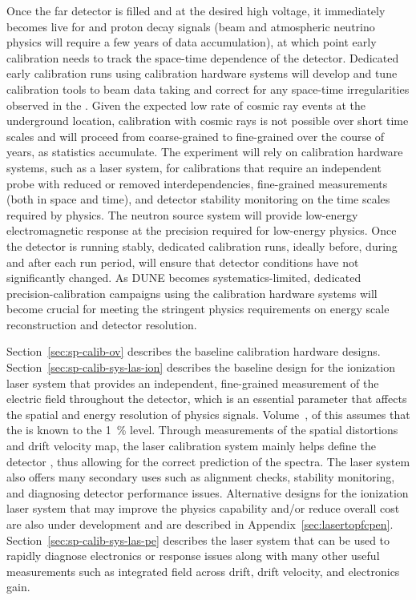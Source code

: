 Once the far detector is filled and at the desired high voltage, it immediately becomes live for  and proton decay signals (beam and atmospheric neutrino physics will require a few years of data accumulation), at which point %
early calibration needs to track %
the space-time dependence of the detector. Dedicated early calibration runs using calibration hardware systems will develop and tune calibration tools to beam data taking and correct for any space-time irregularities observed in the . Given the expected low rate of cosmic ray events at the underground location, calibration with cosmic rays is not possible over short time scales and will proceed from coarse-grained to fine-grained over the course of years, as statistics accumulate. 
The experiment will rely on calibration hardware systems, such as a laser system, for calibrations that require an independent probe with reduced or removed interdependencies, fine-grained measurements (both in space and time), and detector stability monitoring on the time scales required by physics. The neutron source system will provide low-energy electromagnetic response at the precision required for low-energy  physics. 
Once the detector is running stably, dedicated calibration runs, ideally before, during and after each run period, will ensure that detector conditions have not significantly changed. As DUNE becomes systematics-limited, dedicated precision-calibration campaigns using the calibration hardware systems will become crucial for meeting the stringent physics requirements on energy scale reconstruction and detector resolution.

Section~\ref{sec:sp-calib-ov} describes the baseline calibration hardware designs. Section~\ref{sec:sp-calib-sys-las-ion} describes the baseline design for the ionization laser system that provides an independent, fine-grained measurement of the electric field throughout the detector, which is an essential parameter that affects the spatial and energy resolution of physics signals. 
Volume~\volnumberphysics, \voltitlephysics of this 
assumes that the  is known to the \SI{1}{\%} level. Through measurements of the spatial distortions and drift velocity map, the laser calibration system mainly helps define the detector , thus allowing for the correct prediction of the  spectra. The laser system also offers many secondary uses such as alignment checks, stability monitoring, and diagnosing detector performance issues. Alternative designs for the ionization laser system that may improve the physics capability and/or reduce overall cost are also under development and are described in Appendix~\ref{sec:lasertopfcpen}. %
Section~\ref{sec:sp-calib-sys-las-pe} describes the \phel laser system that can be used to rapidly diagnose electronics or  response issues along with many other useful measurements such as integrated field across drift, drift velocity, and electronics gain. 

